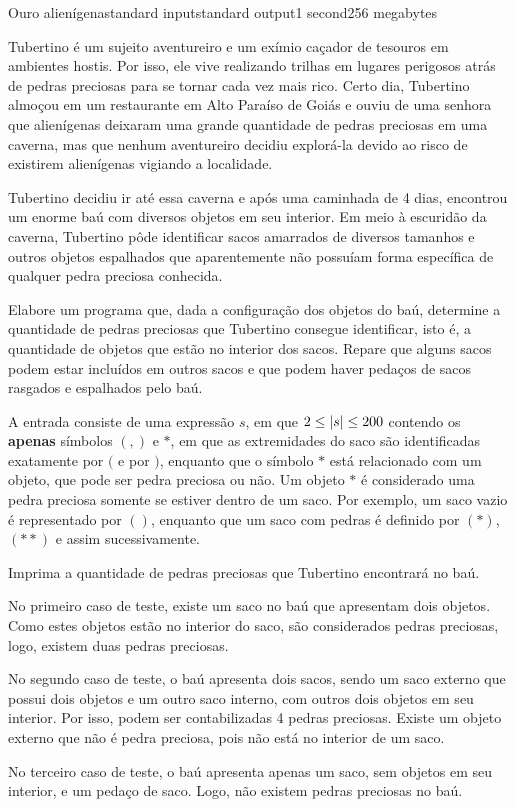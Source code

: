 \begin{problem}{Ouro alienígena}{standard input}{standard output}{1 second}{256 megabytes}

Tubertino é um sujeito aventureiro e um exímio caçador de tesouros em ambientes hostis. Por isso, ele vive realizando trilhas em lugares perigosos atrás de pedras preciosas para se tornar cada vez mais rico. Certo dia, Tubertino almoçou em um restaurante em Alto Paraíso de Goiás e ouviu de uma senhora que alienígenas deixaram uma grande quantidade de pedras preciosas em uma caverna, mas que nenhum aventureiro decidiu explorá-la devido ao risco de existirem alienígenas vigiando a localidade. 

Tubertino decidiu ir até essa caverna e após uma caminhada de 4 dias, encontrou um enorme baú com diversos objetos em seu interior. Em meio à escuridão da caverna, Tubertino pôde identificar sacos amarrados de diversos tamanhos e outros objetos espalhados que aparentemente não possuíam forma específica de qualquer pedra preciosa conhecida. 

Elabore um programa que, dada a configuração dos objetos do baú, determine a quantidade de pedras preciosas que Tubertino consegue identificar, isto é, a quantidade de objetos que estão no interior dos sacos. Repare que alguns sacos podem estar incluídos em outros sacos e que podem haver pedaços de sacos rasgados e espalhados pelo baú.

\InputFile
A entrada consiste de uma expressão $s$, em que $2 \leq \arrowvert s \arrowvert \leq 200$ contendo os \textbf{apenas} símbolos $(,)$ e $*$, em que as extremidades do saco são identificadas exatamente por $($ e por $)$, enquanto que o símbolo $*$ está relacionado com um objeto, que pode ser pedra preciosa ou não. Um objeto $*$ é considerado uma pedra preciosa somente se estiver dentro de um saco. Por exemplo, um saco vazio é representado por $()$, enquanto que um saco com pedras é definido por $(*)$, $(**)$ e assim sucessivamente.

\OutputFile
Imprima a quantidade de pedras preciosas que Tubertino encontrará no baú.

\Examples

\begin{example}
%
%
%
\end{example}

\Note
No primeiro caso de teste, existe um saco no baú que apresentam dois objetos. Como estes objetos estão no interior do saco, são considerados pedras preciosas, logo, existem duas pedras preciosas.

No segundo caso de teste, o baú apresenta dois sacos, sendo um saco externo que possui dois objetos e um outro saco interno, com outros dois objetos em seu interior. Por isso, podem ser contabilizadas 4 pedras preciosas. Existe um objeto externo que não é pedra preciosa, pois não está no interior de um saco.

No terceiro caso de teste, o baú apresenta apenas um saco, sem objetos em seu interior, e um pedaço de saco. Logo, não existem pedras preciosas no baú.

\end{problem}

